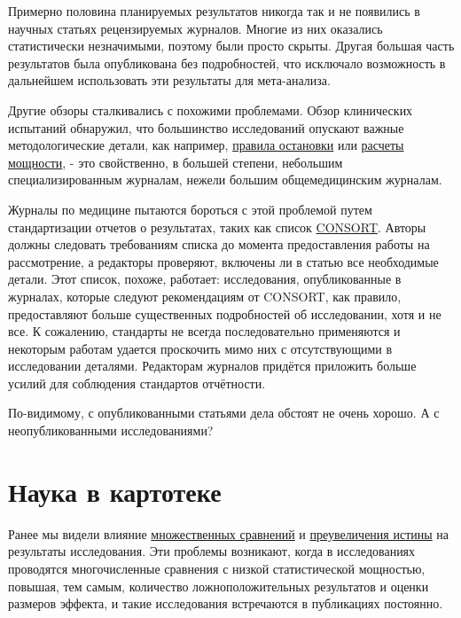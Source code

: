 Примерно половина планируемых результатов никогда так и не появились в научных статьях рецензируемых журналов. Многие из них оказались статистически незначимыми, поэтому были просто скрыты. Другая большая часть результатов была опубликована без подробностей, что исключало возможность в дальнейшем использовать эти результаты для мета-анализа.\cite{chan_empirical_2004} 


Другие обзоры сталкивались с похожими проблемами. Обзор клинических испытаний обнаружил, что большинство исследований опускают важные методологические детали, как например, \hyperref[chp7]{правила остановки} или \hyperref[chp3]{расчеты мощности}, - это свойственно, в большей степени, небольшим специализированным журналам, нежели большим общемедицинским журналам.\cite{huwiler-muntener_quality_2002}

Журналы по медицине пытаются бороться с этой проблемой путем стандартизации отчетов о результатах, таких как список \href{http://www.consort-statement.org/}{CONSORT}. Авторы должны следовать требованиям списка до момента предоставления работы на рассмотрение, а редакторы проверяют, включены ли в статью все необходимые детали. Этот список, похоже, работает: исследования, опубликованные в журналах, которые следуют рекомендациям от CONSORT, как правило, предоставляют больше существенных подробностей об исследовании, хотя и не все.\cite{plint_does_2006} К сожалению, стандарты не всегда последовательно применяются и некоторым работам удается проскочить мимо них с отсутствующими в исследовании деталями.\cite{mills_analysis_2005} Редакторам журналов придётся приложить больше усилий для соблюдения стандартов отчётности.

По-видимому, с опубликованными статьями дела обстоят не очень хорошо. А с неопубликованными исследованиями?


\section{Наука в картотеке}
\label{chp10:sciencecabinet}

Ранее мы видели влияние \hyperref[chp5:try-again]{множественных сравнений} и \hyperref[chp7:truthinflation]{преувеличения истины} на результаты исследования. Эти проблемы возникают, когда в исследованиях проводятся многочисленные сравнения с низкой статистической мощностью, повышая, тем самым, количество ложноположительных результатов и оценки размеров эффекта, и такие исследования встречаются в публикациях постоянно.

